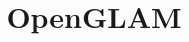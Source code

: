 \documentclass{article}
\begin{document}
\title{OpenGLAM}

\maketitle


\subsection{}\label{H8963524}



\subsection{}\label{H4450718}
\end{document}
